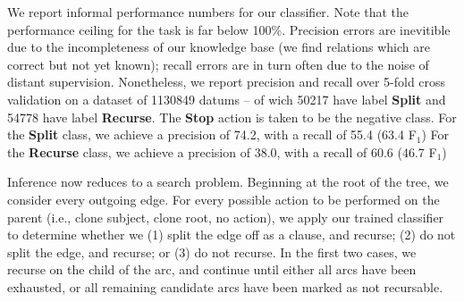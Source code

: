 We report informal performance numbers for our classifier.
Note that the performance ceiling for the task is far below 100\%.
Precision errors are inevitible due to the incompleteness of our
  knowledge base (we find relations which are correct but not yet known);
  recall errors are in turn often due to the noise of distant supervision.
Nonetheless, we report precision and recall
  over 5-fold cross validation on a dataset of
  \num{1130849} datums -- of wich \num{50217} have label \textbf{Split} and
  \num{54778} have label \textbf{Recurse}.
The \textbf{Stop} action is taken to be the negative class.
For the \textbf{Split} class, we achieve a precision of 74.2, with a recall
  of 55.4 (63.4 F$_1$)
For the \textbf{Recurse} class, we achieve a precision of 38.0, with a recall
  of 60.6 (46.7 F$_1$)

Inference now reduces to a search problem.
Beginning at the root of the tree, we consider every outgoing edge.
  For every possible action to be performed on the parent (i.e., clone subject,
  clone root, no action), we apply our trained classifier to determine
  whether we 
  (1) split the edge off as a clause, and recurse;
  (2) do not split the edge, and recurse; or 
  (3) do not recurse.
In the first two cases, we recurse on the child of the arc, and continue until
  either all arcs have been exhausted, or all remaining candidate arcs
  have been marked as not recursable.


